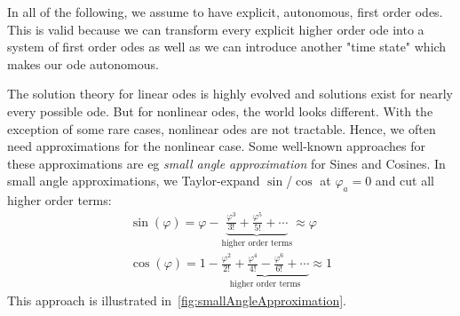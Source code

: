 		In all of the following, we assume to have explicit, autonomous, first order \acp{ode}. This is valid because we can transform every explicit higher order \ac{ode} into a system of first order \acp{ode} as well as we can introduce another "time state" which makes our \ac{ode} autonomous.

		The solution theory for linear \acp{ode} is highly evolved and solutions exist for nearly every possible \ac{ode}. But for nonlinear \acp{ode}, the world looks different. With the exception of some rare cases, nonlinear \acp{ode} are not tractable. Hence, we often need approximations for the nonlinear case. Some well-known approaches for these approximations are \ac{eg} \emph{small angle approximation} for Sines and Cosines. In small angle approximations, we Taylor-expand \( \sin \)/\( \cos \) at \( \varphi_a = 0 \) and cut all higher order terms:
		\begin{gather*}
			\sin(\varphi) = \varphi - \underbrace{\frac{\varphi^3}{3!} + \frac{\varphi^5}{5!} + \cdots}_\text{higher order terms} \approx \varphi \\
			\cos(\varphi) = 1 - \underbrace{\frac{\varphi^2}{2!} + \frac{\varphi^4}{4!} - \frac{\varphi^6}{6!} + \cdots}_\text{higher order terms} \approx 1
		\end{gather*}
		This approach is illustrated in~\autoref{fig:smallAngleApproximation}.

